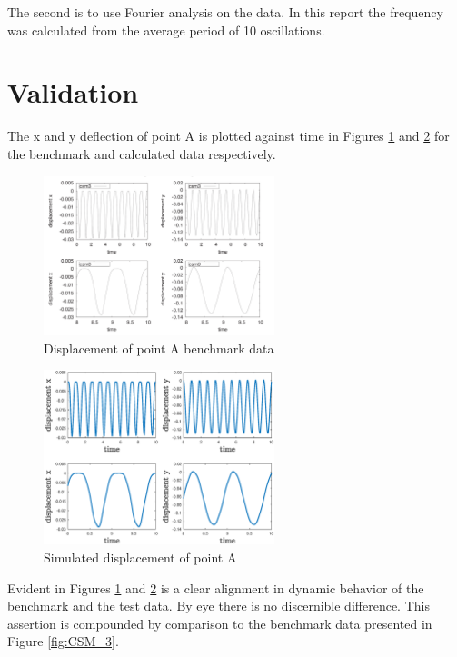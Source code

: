\documentclass{article}
\begin{document}
The second is to use Fourier analysis on the data. In this report the frequency was calculated from the average period of 10 oscillations. 

\section{Validation} 

The x and y deflection of point A is plotted against time in Figures \ref{fig:CSM_1} and \ref{fig:CSM_2} for the benchmark and calculated data respectively. 

\begin{figure}[h]
\centering
	\includegraphics[width=0.6\textwidth]{CSM_1}
	\caption{Displacement of point A benchmark data \cite{turek2006proposal}}
	\label{fig:CSM_1}
\end{figure}

\begin{figure}[h]
\centering
	\includegraphics[width=0.6\textwidth]{CSM_2}
	\caption{Simulated displacement of point A}
	\label{fig:CSM_2}
\end{figure}


Evident in Figures \ref{fig:CSM_1} and \ref{fig:CSM_2} is a clear alignment in dynamic behavior of the benchmark and the test data. By eye there is no discernible difference. This assertion is compounded by comparison to the benchmark data presented in Figure \ref{fig:CSM_3}.
\end{document}
